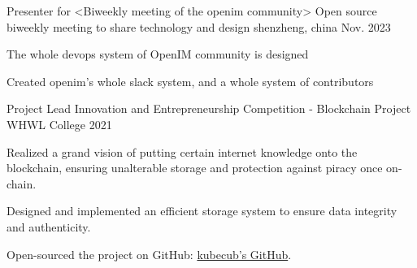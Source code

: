 

\begin{cventries}

  \cventry
    {Presenter for <Biweekly meeting of the openim community>} %
    {Open source biweekly meeting to share technology and design} %
    {shenzheng, china} %
    {Nov. 2023} %
    {
      \begin{cvitems} %
        \item {The whole devops system of OpenIM community is designed}
        \item {Created openim's whole slack system, and a whole system of contributors}
      \end{cvitems}
    }

    \cventry
      {Project Lead} %
      {Innovation and Entrepreneurship Competition - Blockchain Project} %
      {WHWL College} %
      {2021} %
      {
        \begin{cvitems} %
          \item {Realized a grand vision of putting certain internet knowledge onto the blockchain, ensuring unalterable storage and protection against piracy once on-chain.}
          \item {Designed and implemented an efficient storage system to ensure data integrity and authenticity.}
          \item {Open-sourced the project on GitHub: \href{https://github.com/kubecub?view_as=public}{kubecub's GitHub}.}
        \end{cvitems}
      }

\end{cventries}
